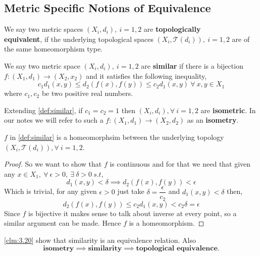 \documentclass{scrartcl} %
\newcommand{\Tau}{\mathcal{T}}
\begin{document}
\subsection{Metric Specific Notions of Equivalence}
\begin{definition}
We say two metric spaces $\left(X_i, d_i\right),\ i = 1,2$ are \textbf{topologically} \\ \textbf{equivalent}, if
	the underlying topological spaces $\left(X_i, \Tau(d_i)\right),\ i = 1,2$ are of the
	same homeomorphism type.
\end{definition}
\begin{definition}\label{def:similar}
	We say two metric space $\left(X_i, d_i\right),\ i = 1,2$ are \textbf{similar} if there is a 
	bijection $f: (X_1,d_1) \rightarrow (X_2,x_2)$ and it satisfies the following inequality, 
	\[
		c_1d_1(x,y) \leq d_2(f(x),f(y)) \leq c_2d_1(x,y) \ \forall\ x,y \in X_1
	\]
where $c_1, c_2$ be two positive real numbers.
\end{definition}
\begin{definition}
	Extending \autoref{def:similar}, if $c_1 = c_2 = 1$ then $\left(X_i, d_i\right), \forall\ i = 1,2$ are
	\textbf{isometric}. In our notes we will refer to such a $f:(X_1, d_1) \rightarrow (X_2, d_2)$ as
	an \textbf{isometry}.
\end{definition}
\begin{claim}\label{clm:3.20}
	$f$ in \autoref{def:similar} is a homeomorphsim between the underlying topology $\left(X_i, \Tau(d_i)\right),
\forall\ i = 1,2$.  
\end{claim}
\begin{proof}
So we want to show that $f$ is continuous and for that
we need that given any $x \in X_1, \ \forall\
\epsilon > 0, \ \exists\ \delta > 0 \  s.t$,
\[
	d_1(x,y) < \delta \implies
	d_2(f(x),f(y)) < \epsilon
\]
Which is trivial, for any given $\epsilon > 0$
just take 
$\delta = \dfrac{\epsilon}{c_2}$ and $ d_1(x,y) < \delta
$ then,
\[
d_2(f(x), f(y)) \leq c_2d_1(x,y) < c_2\delta = \epsilon
\]
Since $f$ is bijective it makes sense to talk about 
inverse at every point, so a similar argument can be 
made. Hence $f$ is a homeomorphism.
\end{proof}
\begin{remark}
	\autoref{clm:3.20} show that similarity is an 
	equivalence relation. Also
	\[
		\textbf{isometry} \implies 
		\textbf{similarity} \implies
		\textbf{topological equivalence}.
        \]
\end{remark}
\end{document}
